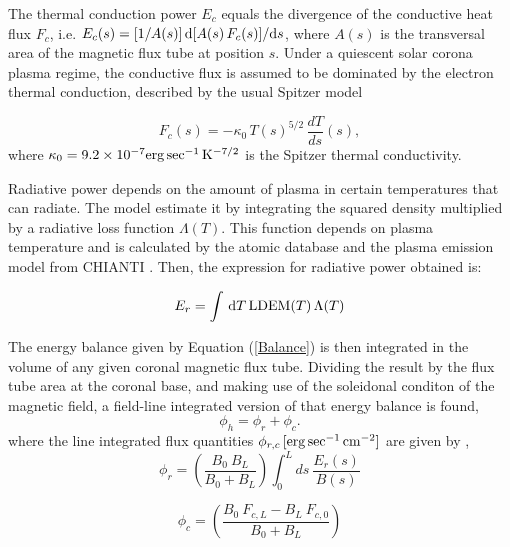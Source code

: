 \documentclass[namedreferences]{solarphysics}
\newcommand{\LDEM}{{\rm LDEM}}
\begin{document}
\begin{article}
{The thermal conduction power $E_c$ equals the divergence of the conductive heat flux $F_c$, i.e.
$E_c(s)=[1/A(s)]\,{\rm d}[A(s)\,F_c(s)]/{\rm d}s$, where $A(s)$ is the transversal area of the magnetic flux tube at position $s$. Under a quiescent solar corona plasma regime, the conductive flux is assumed to be dominated by the electron thermal conduction, described by the usual Spitzer model \citep{spitzer_1962}

\begin{equation}\label{Fc}
F_c(s)=-\kappa_0\,{T(s)}^{5/2}\,\frac{dT}{ds}(s),
\end{equation}
where $\kappa_0 = 9.2 \times 10^{-7}  {\rm erg\,sec^{-1}\,K^{-7/2}}$ is the Spitzer thermal conductivity.}

Radiative power depends on the amount of plasma in certain temperatures that can radiate. The model estimate it by integrating the squared density multiplied by a radiative loss function $\Lambda(T)$. This function depends on plasma temperature and is calculated by the atomic database and the plasma emission model from CHIANTI \citep{delzanna_2015}. Then, the expression for radiative power obtained is:

\begin{equation}\label{Er}
E_r = \int\,\textrm{d}T\,\LDEM(T)\,\Lambda(T)
\end{equation}

{The energy balance given by Equation (\ref{Balance}) is then integrated in the volume of any given coronal magnetic flux tube. Dividing the result by the flux tube area at the coronal base, and making use of the soleidonal conditon of the magnetic field, a field-line integrated version of that energy balance is found,
\begin{equation}\label{FluxBalance}
\phi_h = \phi_r + \phi_c.
\end{equation}
\noindent
where the line integrated flux quantities $\phi_{r,c}\,[\rm{erg\,sec^{-1}\,cm^{-2}}]$ are given by \citep{maccormack_2017},} \\


\begin{equation}\label{phi_r}
\phi_r = \left( \frac{B_0 \ B_L}{B_0 + B_L} \right) \int_{0}^{L} ds \ \frac{E_r(s)}{B(s)}
\end{equation}

\begin{equation}\label{phi_c}
\phi_c = \left( \frac{B_0 \ F_{c,L} - B_L \ F_{c,0}}{B_0 + B_L} \right) 
\end{equation}


\end{article}
\end{document}
